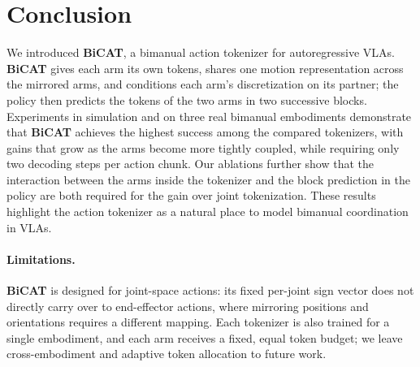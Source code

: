 \section{Conclusion}
\label{sec:conclusion}
We introduced \textbf{BiCAT}, a bimanual action tokenizer for autoregressive VLAs. \textbf{BiCAT} gives each arm its own tokens, shares one motion representation across the mirrored arms, and conditions each arm's
discretization on its partner; the policy then predicts the tokens of the
two arms in two successive blocks. Experiments in simulation and on three
real bimanual embodiments demonstrate that \textbf{BiCAT} achieves the
highest success among the compared tokenizers, with gains that grow as the
arms become more tightly coupled, while requiring only two decoding steps
per action chunk. Our ablations further show that the interaction between
the arms inside the tokenizer and the block prediction in the policy are
both required for the gain over joint tokenization. These results
highlight the action tokenizer as a natural place to model bimanual
coordination in VLAs.

\paragraph{Limitations.}
\textbf{BiCAT} is designed for joint-space actions: its fixed per-joint sign
vector does not directly carry over to end-effector actions, where
mirroring positions and orientations requires a different mapping. Each
tokenizer is also trained for a single embodiment, and each arm receives a
fixed, equal token budget; we leave cross-embodiment and adaptive token
allocation to future work.
